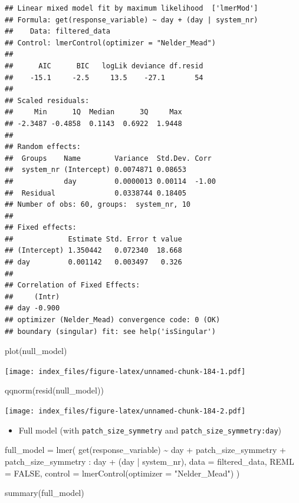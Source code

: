 \documentclass[
]{article}
\newenvironment{Shaded}{\begin{snugshade}}{\end{snugshade}}
\newcommand{\AttributeTok}[1]{\textcolor[rgb]{0.77,0.63,0.00}{#1}}
\newcommand{\ConstantTok}[1]{\textcolor[rgb]{0.00,0.00,0.00}{#1}}
\newcommand{\FunctionTok}[1]{\textcolor[rgb]{0.00,0.00,0.00}{#1}}
\newcommand{\NormalTok}[1]{#1}
\newcommand{\OtherTok}[1]{\textcolor[rgb]{0.56,0.35,0.01}{#1}}
\newcommand{\SpecialCharTok}[1]{\textcolor[rgb]{0.00,0.00,0.00}{#1}}
\newcommand{\StringTok}[1]{\textcolor[rgb]{0.31,0.60,0.02}{#1}}
\providecommand{\tightlist}{%
  \setlength{\itemsep}{0pt}\setlength{\parskip}{0pt}}
\begin{document}
\begin{verbatim}
## Linear mixed model fit by maximum likelihood  ['lmerMod']
## Formula: get(response_variable) ~ day + (day | system_nr)
##    Data: filtered_data
## Control: lmerControl(optimizer = "Nelder_Mead")
## 
##      AIC      BIC   logLik deviance df.resid 
##    -15.1     -2.5     13.5    -27.1       54 
## 
## Scaled residuals: 
##     Min      1Q  Median      3Q     Max 
## -2.3487 -0.4858  0.1143  0.6922  1.9448 
## 
## Random effects:
##  Groups    Name        Variance  Std.Dev. Corr 
##  system_nr (Intercept) 0.0074871 0.08653       
##            day         0.0000013 0.00114  -1.00
##  Residual              0.0338744 0.18405       
## Number of obs: 60, groups:  system_nr, 10
## 
## Fixed effects:
##             Estimate Std. Error t value
## (Intercept) 1.350442   0.072340  18.668
## day         0.001142   0.003497   0.326
## 
## Correlation of Fixed Effects:
##     (Intr)
## day -0.900
## optimizer (Nelder_Mead) convergence code: 0 (OK)
## boundary (singular) fit: see help('isSingular')
\end{verbatim}

\begin{Shaded}
\begin{Highlighting}[]
\FunctionTok{plot}\NormalTok{(null\_model)}
\end{Highlighting}
\end{Shaded}

\texttt{[image: index\_files/figure-latex/unnamed-chunk-184-1.pdf]}

\begin{Shaded}
\begin{Highlighting}[]
\FunctionTok{qqnorm}\NormalTok{(}\FunctionTok{resid}\NormalTok{(null\_model))}
\end{Highlighting}
\end{Shaded}

\texttt{[image: index\_files/figure-latex/unnamed-chunk-184-2.pdf]}

\begin{itemize}
\tightlist
\item
  Full model (with \texttt{patch\_size\_symmetry} and
  \texttt{patch\_size\_symmetry:day})
\end{itemize}

\begin{Shaded}
\begin{Highlighting}[]
\NormalTok{full\_model }\OtherTok{=} \FunctionTok{lmer}\NormalTok{(}
  \FunctionTok{get}\NormalTok{(response\_variable) }\SpecialCharTok{\textasciitilde{}}
\NormalTok{    day }\SpecialCharTok{+} 
\NormalTok{    patch\_size\_symmetry }\SpecialCharTok{+}
\NormalTok{    patch\_size\_symmetry }\SpecialCharTok{:}\NormalTok{ day }\SpecialCharTok{+} 
\NormalTok{    (day }\SpecialCharTok{|}\NormalTok{ system\_nr), }
  \AttributeTok{data =}\NormalTok{ filtered\_data,}
  \AttributeTok{REML =} \ConstantTok{FALSE}\NormalTok{,}
  \AttributeTok{control =} \FunctionTok{lmerControl}\NormalTok{(}\AttributeTok{optimizer =} \StringTok{"Nelder\_Mead"}\NormalTok{)}
\NormalTok{)}

\FunctionTok{summary}\NormalTok{(full\_model)}
\end{Highlighting}
\end{Shaded}
\end{document}
